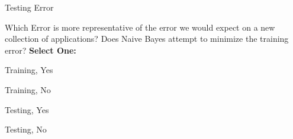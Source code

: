 \begin{enumerate}
    Testing Error\\ \begin{tcolorbox}[fit,height=1.5cm, width=12cm, blank, borderline={1pt}{-2pt},nobeforeafter]
    \end{tcolorbox}\hspace{2cm}
    
    
     Which Error is more representative of the error we would expect on a new collection of applications? Does Naive Bayes attempt to minimize the training error?
    \textbf{Select One:}
    \begin{list}{}
        \item \Circle{} Training, Yes
        \item \Circle{} Training, No
        \item \Circle{} Testing, Yes
        \item \Circle{} Testing, No
    \end{list}
    
    
\end{enumerate}




